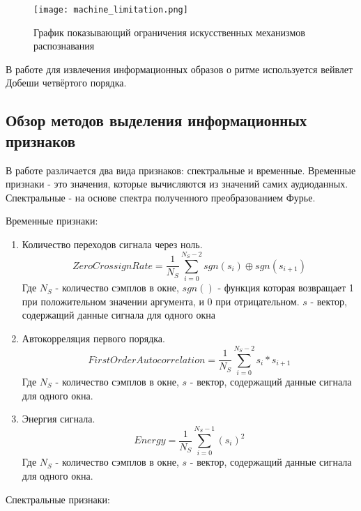 \begin{figure}[ht]
\centering
  \texttt{[image: machine\_limitation.png]}
  \caption{График показывающий ограничения искусственных механизмов распознавания}
  \label{fig:domain:machine_limitation}
\end{figure}

В работе для извлечения информационных образов о ритме используется вейвлет Добеши четвёртого порядка. 

\subsection{Обзор методов выделения информационных признаков}
\label{sub:domain:feature_extraction}
В работе различается два вида признаков: спектральные и временные. Временные признаки - это значения, которые вычисляются из значений самих аудиоданных. Спектральные -  на основе спектра полученного преобразованием Фурье. 

Временные признаки:
\begin{enumerate}[label=\arabic*.]
\item Количество переходов сигнала через ноль.
\begin{equation}\label{eq:zcr}
ZeroCrossignRate =  \frac{1}{N_S} \sum \limits_{i=0}^{N_S - 2} sgn(s_i)  \oplus sgn(s_{i+1})
\end{equation}  
Где $ N_S $ - количество сэмплов в окне, $ sgn() $ - функция которая возвращает 1 при положительном значении аргумента, и 0 при отрицательном.  $ s $ - вектор, содержащий данные сигнала для одного окна	
\item Автокорреляция первого порядка.
\begin{equation}\label{eq:autocorrelation}
FirstOrderAutocorrelation =  \frac{1}{N_S} \sum \limits_{i=0}^{N_S - 2} s_i  * s_{i+1}
\end{equation}  
Где $ N_S $ - количество сэмплов в окне,  $ s $ - вектор, содержащий данные сигнала для одного окна.	
\item Энергия сигнала.
\begin{equation}\label{eq:autocorrelation}
Energy =  \frac{1}{N_S} \sum \limits_{i=0}^{N_S - 1} ( s_i )^2
\end{equation}  
Где $ N_S $ - количество сэмплов в окне,  $ s $ - вектор, содержащий данные сигнала для одного окна.	
\end{enumerate}

Спектральные признаки:

